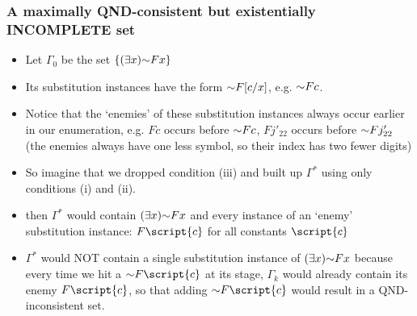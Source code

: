 \begin{frame}
\frametitle{A maximally QND-consistent but existentially INCOMPLETE set}

\begin{itemize}[<+->]

\item Let $\Gamma_0$ be the set $\{ \qt{\exists}{x}\enot Fx \}$

\item Its substitution instances have the form $\enot F[c/x]$, e.g. $\enot Fc$. 

\item Notice that the `enemies' of these substitution instances always occur earlier in our enumeration, e.g. $Fc$ occurs before $\enot Fc$, $Fj'_{22}$ occurs before $\enot Fj'_{22}$ (the enemies always have one less symbol, so their index has two fewer digits)

\item So imagine that we dropped condition (iii) and built up $\Gamma^{\ast}$ using only conditions (i) and (ii). 

\item then $\Gamma^{\ast}$ would contain $\qt{\exists}{x}\enot Fx$ and every instance of an `enemy' substitution instance: $F\script{c}$ for all constants $\script{c}$

\item  $\Gamma^{\ast}$ would NOT contain a single substitution instance of $\qt{\exists}{x}\enot Fx$ because every time we hit a $\enot F\script{c}$ at its stage, $\Gamma_k$ would already contain its enemy $F\script{c}$, so that adding $\enot F\script{c}$ would result in a QND-inconsistent set. 





\end{itemize}
\end{frame}

